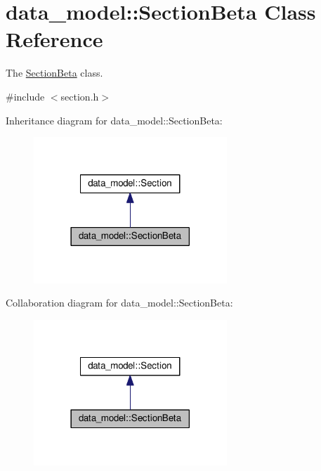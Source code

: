 \hypertarget{classdata__model_1_1_section_beta}{}\section{data\+\_\+model\+:\+:Section\+Beta Class Reference}
\label{classdata__model_1_1_section_beta}


The \hyperlink{classdata__model_1_1_section_beta}{Section\+Beta} class.  




{\ttfamily \#include $<$section.\+h$>$}



Inheritance diagram for data\+\_\+model\+:\+:Section\+Beta\+:
\nopagebreak
\begin{figure}[H]
\begin{center}
\leavevmode
\includegraphics[width=206pt]{classdata__model_1_1_section_beta__inherit__graph}
\end{center}
\end{figure}


Collaboration diagram for data\+\_\+model\+:\+:Section\+Beta\+:
\nopagebreak
\begin{figure}[H]
\begin{center}
\leavevmode
\includegraphics[width=206pt]{classdata__model_1_1_section_beta__coll__graph}
\end{center}
\end{figure}
